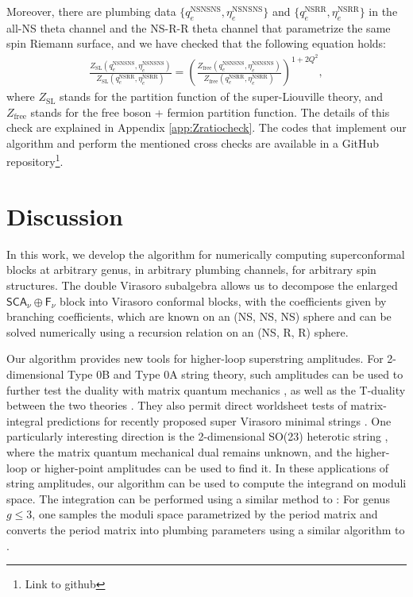 \documentclass[12pt]{article}
\def\ie{\begin{equation}\begin{aligned}}
\def\fe{\end{aligned}\end{equation}}
\def\NS{\mathrm{NS}}
\def\R{\mathrm{R}}
\begin{document}
Moreover, there are plumbing data $\{q_e^{\NS\NS\NS}, \eta_e^{\NS\NS\NS}\}$ and $\{q_e^{\NS\R\R}, \eta_e^{\NS\R\R}\}$ in the all-NS theta channel and the NS-R-R theta channel that parametrize the same spin Riemann surface, and we have checked that the following equation holds:
\ie 
\frac{Z_\mathrm{\mathrm{SL}}(q_e^{\NS\NS\NS}, \eta_e^{\NS\NS\NS})}{Z_\mathrm{\mathrm{SL}}(q_e^{\NS\R\R}, \eta_e^{\NS\R\R})} = \left(\frac{Z_{\mathrm{free}}(q_e^{\NS\NS\NS}, \eta_e^{\NS\NS\NS})}{Z_{\mathrm{free}}(q_e^{\NS\R\R}, \eta_e^{\NS\R\R})}\right)^{1+2Q^2},
\fe
where $Z_{\mathrm{SL}}$ stands for the partition function of the super-Liouville theory, and $Z_{\mathrm{free}}$ stands for the free boson + fermion partition function. The details of this check are explained in Appendix \ref{app:Zratiocheck}. The codes that implement our algorithm and perform the mentioned cross checks are available in a GitHub repository\footnote{Link to github}.

\section{Discussion}

\label{sec:disc}

In this work, we develop the algorithm for numerically computing superconformal blocks at arbitrary genus, in arbitrary plumbing channels, for arbitrary spin structures. The double Virasoro subalgebra allows us to decompose the enlarged $\mathsf{SCA}_\nu \oplus \mathsf{F}_\nu$ block into Virasoro conformal blocks, with the coefficients given by branching coefficients, which are known on an (NS, NS, NS) sphere and can be solved numerically using a recursion relation on an (NS, R, R) sphere.

Our algorithm provides new tools for higher-loop superstring amplitudes. For 2-dimensional Type 0B and Type 0A string theory, such amplitudes can be used to further test the duality with matrix quantum mechanics \cite{Takayanagi:2003sm,Douglas:2003up,Balthazar:2022atu,Balthazar:2022apu}, as well as the T-duality between the two theories \cite{Yin:2003iv}. They also permit direct worldsheet tests of matrix-integral predictions for recently proposed super Virasoro minimal strings \cite{Johnson:2024fkm,Johnson:2025vyz,Johnson:2026ugu,Rangamani:2025wfa,Eberhardt:2026hfh}. One particularly interesting direction is the 2-dimensional SO(23) heterotic string \cite{Davis:2005qe}, where the matrix quantum mechanical dual remains unknown, and the higher-loop or higher-point amplitudes can be used to find it. In these applications of string amplitudes, our algorithm can be used to compute the integrand on moduli space. The integration can be performed using a similar method to \cite{Christian:new}: For genus $g\leq 3$, one samples the moduli space parametrized by the period matrix and converts the period matrix into plumbing parameters using a similar algorithm to \cite{Christian:2026qqy}. 
\end{document}
